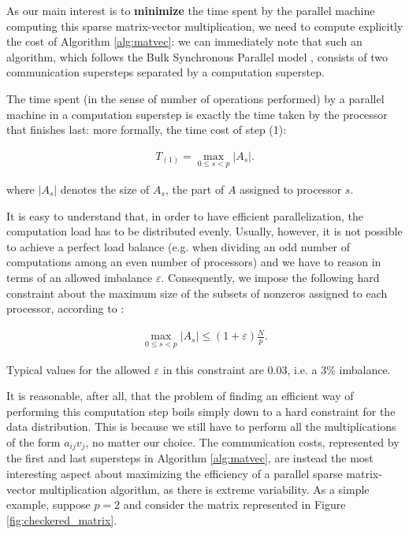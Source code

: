 As our main interest is to \textbf{minimize} the time spent by the parallel machine computing this sparse matrix-vector multiplication, we need to compute explicitly the cost of Algorithm \ref{alg:matvec}: we can immediately note that such an algorithm, which follows the Bulk Synchronous Parallel model \cite{bsp_paper}, consists of two communication supersteps separated by a computation superstep.

The time spent (in the sense of number of operations performed) by a parallel machine in a computation superstep is exactly the time taken by the processor that finishes last: more formally, the time cost of step (1):

\begin{align}
	T_{(1)} = \max_{0 \leq s < p } |A_s|.
	\label{eq:T_comp}
\end{align}

where $|A_s|$ denotes the size of $A_s$, the part of $A$ assigned to processor $s$.

It is easy to understand that, in order to have efficient parallelization, the computation load has to be distributed evenly. Usually, however, it is not possible to achieve a perfect load balance (e.g. when dividing an odd number of computations among an even number of processors) and we have to reason in terms of an allowed imbalance $\varepsilon$. Consequently, we impose the following hard constraint about the maximum size of the subsets of nonzeros assigned to each processor, according to \cite[eq.~4.27]{BSP}:

\begin{align}
	\max_{0 \leq s <p} |A_s| \leq (1+\varepsilon) \frac{N}{p}.
	\label{eq:balance}
\end{align}

Typical values for the allowed $\varepsilon$ in this constraint are 0.03, i.e. a 3\% imbalance.

It is reasonable, after all, that the problem of finding an efficient way of performing this computation step boils simply down to a hard constraint for the data distribution. This is because we still have to perform all the multiplications of the form $a_{ij} v_j$, no matter our choice. The communication costs, represented by the first and last supersteps in Algorithm \ref{alg:matvec}, are instead the most interesting aspect about maximizing the efficiency of a parallel sparse matrix-vector multiplication algorithm, as there is extreme variability. As a simple example, suppose $p=2$ and consider the matrix represented in Figure \ref{fig:checkered_matrix}. 

